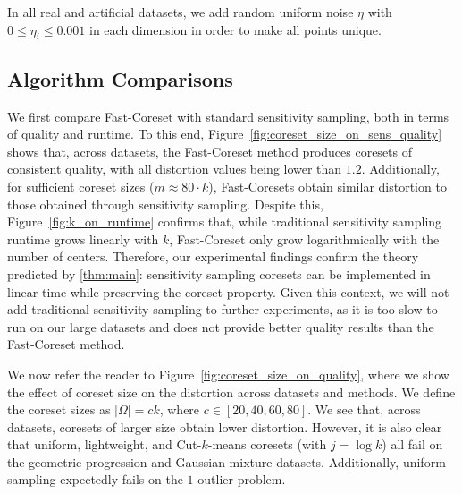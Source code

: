 In all real and artificial datasets, we add random uniform noise $\eta$ with $0 \leq \eta_i \leq 0.001$ in each dimension in order to make all points unique.

\subsection{Algorithm Comparisons}
\label{ssec:alg_qualities}

We first compare Fast-Coreset with standard sensitivity sampling, both in terms of quality and runtime. 
To this end,
Figure~\ref{fig:coreset_size_on_sens_quality} shows that, across datasets, the Fast-Coreset method produces coresets of consistent quality, with all distortion
values being lower than $1.2$. 
Additionally, for sufficient coreset sizes ($m \approx 80\cdot k$), Fast-Coresets obtain similar distortion to those obtained
through sensitivity sampling. Despite this, Figure~\ref{fig:k_on_runtime} confirms that, while traditional sensitivity sampling runtime grows linearly with $k$,
Fast-Coreset only grow logarithmically with the number of centers. 
 Therefore, our experimental findings confirm the theory predicted by \cref{thm:main}:
sensitivity sampling coresets can be implemented in linear time while preserving the coreset property. Given this context, we will not add traditional
sensitivity sampling to further experiments, as it is too slow to run on our large datasets and does not provide better quality results than the Fast-Coreset
method.

We now refer the reader to Figure~\ref{fig:coreset_size_on_quality}, where we show the effect of coreset size on the distortion across datasets and methods.  We
define the coreset sizes as $|\Omega| = ck$, where $c \in [20, 40, 60, 80]$. We see that, across datasets, coresets of larger size obtain lower distortion.
However, it is also clear that uniform, lightweight, and Cut-$k$-means coresets (with $j=\log k$)  all fail on the geometric-progression and Gaussian-mixture datasets. Additionally, uniform sampling expectedly fails on the $1$-outlier problem.

